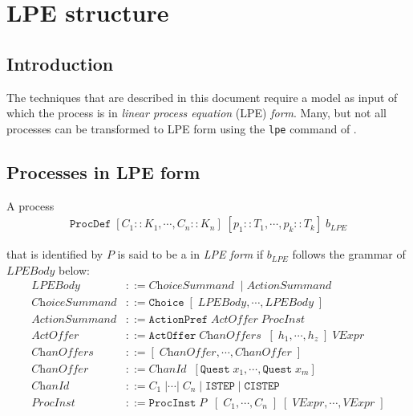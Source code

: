 \chapter{LPE structure}

\section{Introduction}
The techniques that are described in this document require a \txs{} model as input of which the process is in \emph{linear process equation} (LPE) \emph{form}.
Many, but not all \txs{} processes can be transformed to LPE form using the \texttt{lpe} command of \txs{}.

\section{Processes in LPE form} \label{processlpeform}

A \txs{} process
\begin{align*}
\texttt{ProcDef} \; [C_1 :: K_1, \cdots{}, C_n :: K_n] \; [p_1 :: T_1, \cdots{}, p_k :: T_k] \; b_\textit{LPE}
\end{align*}

that is identified by $P$ is said to be a in \emph{LPE form} if $b_\textit{LPE}$ follows the grammar of $\textit{LPEBody}$ below:
\begin{align*}
\textit{LPEBody} &::= \textit{ChoiceSummand} \; \;|\; \textit{ActionSummand} \\
\textit{ChoiceSummand} &::= \texttt{Choice} \; [ \;\! \textit{LPEBody}, \cdots{}, \textit{LPEBody} \; ] \\
\textit{ActionSummand} &::= \texttt{ActionPref} \; \textit{ActOffer} \; \textit{ProcInst} \\
\textit{ActOffer} &::= \texttt{ActOffer} \; \textit{ChanOffers} \;\; [ \; h_1, \cdots{}, h_z \; ] \; \textit{VExpr} \\
\textit{ChanOffers} &::= [ \;\! \textit{ChanOffer}, \cdots{}, \textit{ChanOffer} \; ] \\
\textit{ChanOffer} &::= \textit{ChanId} \;\; [\texttt{Quest} \; x_1, \cdots{}, \texttt{Quest} \; x_m] \\
\textit{ChanId} &::= C_1 \;| \cdots{} |\; C_n \;|\; \texttt{ISTEP} \;|\; \texttt{CISTEP} \\
\textit{ProcInst} &::= \texttt{ProcInst} \; P \; \; [ \; C_1, \cdots{}, C_n \; ] \; [\;\!\textit{VExpr}, \cdots{}, \textit{VExpr} \; ]
\end{align*}

